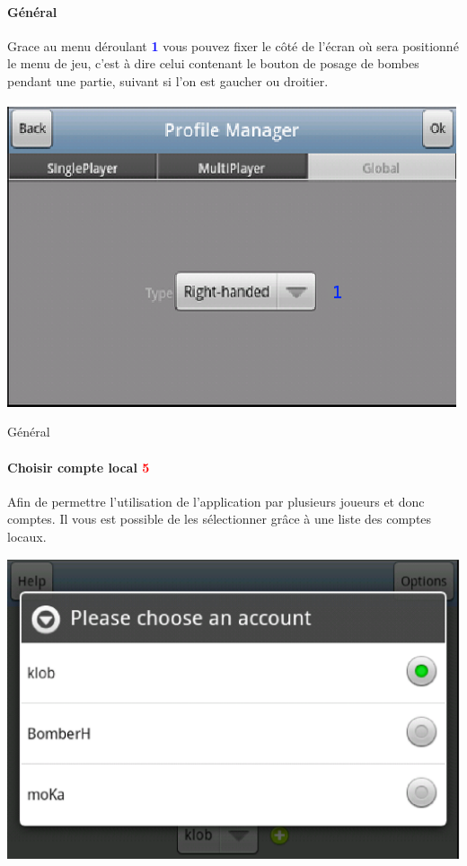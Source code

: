 		
		\paragraph{Général\\}
		Grace au menu déroulant \textcolor{blue}{\textbf{1}} vous pouvez fixer le
		côté de l'écran où sera positionné le menu de jeu, c'est à dire celui contenant le bouton de posage de bombes pendant une
		partie, suivant si l'on est gaucher ou droitier. 
		
		\begin{center}
				\includegraphics[scale=0.7]{Manuel/Img/7.eps}
				\caption{Général}
		\end{center}
			
			
\paragraph{Choisir compte local \textcolor{red}{5}\\}
	Afin de permettre l'utilisation de l'application par plusieurs joueurs et donc
	comptes. Il vous est possible de les sélectionner grâce à une liste des comptes
	locaux. 
	\begin{center}
		\includegraphics[scale=0.5]{Manuel/Img/8.eps}
	\end{center}

